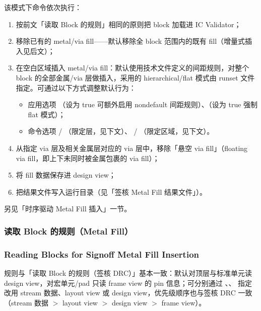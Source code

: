 该模式下命令依次执行：
\begin{enumerate}
  \item 按前文「读取 Block 的规则」相同的原则把 block 加载进 IC Validator；
  \item 移除已有的 metal/via fill——默认移除全 block 范围内的既有 fill（增量式插入见后文）；
  \item 在空白区域插入 metal/via fill：默认使用技术文件定义的间距规则，对整个 block 的全部金属/via 层做插入，采用的 hierarchical/flat 模式由 runset 文件指定。可通过以下方式调整默认行为：
        \begin{itemize}
          \item 应用选项 （设为 true 可额外启用 nondefault 间距规则）、（设为 true 强制 flat 模式）；
          \item 命令选项  / （限定层，见下文）、 / （限定区域，见下文）。
        \end{itemize}
  \item 从指定 via 层及相关金属层对应的 via 层中，移除「悬空 via fill」（floating via fill，即上下未同时被金属包裹的 via fill）；
  \item 将 fill 数据保存进 design view；
  \item 把结果文件写入运行目录（见「签核 Metal Fill 结果文件」）。
\end{enumerate}

\begin{seeAlsoBox}
另见「时序驱动 Metal Fill 插入」一节。
\end{seeAlsoBox}

\subsubsection{读取 Block 的规则（Metal Fill）}
\subsubsection*{Reading Blocks for Signoff Metal Fill Insertion}

规则与「读取 Block 的规则（签核 DRC）」基本一致：默认对顶层与标准单元读 design view，对宏单元/pad 只读 frame view 的 pin 信息；可分别通过 、、 指定改用 stream 数据、layout view 或 design view，优先级顺序也与签核 DRC 一致（stream 数据 $>$ layout view $>$ design view $>$ frame view）。

